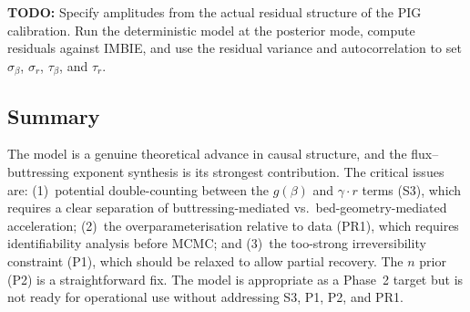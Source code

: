 \documentclass[11pt]{article}
\theoremstyle{definition}
\begin{document}
\textbf{TODO:} Specify amplitudes from the actual residual structure of the PIG calibration.  Run the deterministic model at the posterior mode, compute residuals against IMBIE, and use the residual variance and autocorrelation to set $\sigma_\beta$, $\sigma_r$, $\tau_\beta$, and $\tau_r$.

\subsection{Summary}

The model is a genuine theoretical advance in causal structure, and the flux--buttressing exponent synthesis is its strongest contribution.  The critical issues are: (1)~potential double-counting between the $g(\beta)$ and $\gamma \cdot r$ terms (S3), which requires a clear separation of buttressing-mediated vs.\ bed-geometry-mediated acceleration; (2)~the overparameterisation relative to data (PR1), which requires identifiability analysis before MCMC; and (3)~the too-strong irreversibility constraint (P1), which should be relaxed to allow partial recovery.  The $n$ prior (P2) is a straightforward fix.  The model is appropriate as a Phase~2 target but is not ready for operational use without addressing S3, P1, P2, and PR1.
\end{document}
